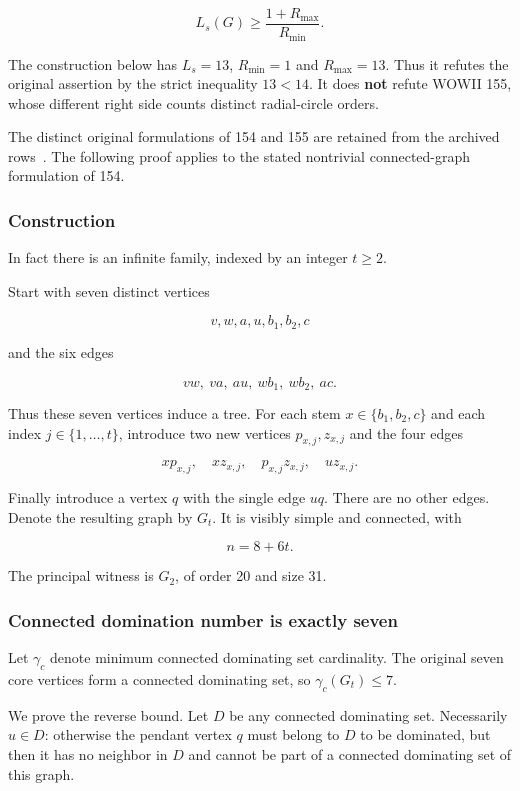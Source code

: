 \documentclass[11pt,a4paper]{article}
\theoremstyle{definition}\newtheorem{definition}[theorem]{Definition}
\theoremstyle{remark}\newtheorem{remark}[theorem]{Remark}
\begin{document}
\[L_s(G)\geq\frac{1+R_{\max}}{R_{\min}}.\]

The construction below has \(L_s=13\), \(R_{\min}=1\) and
\(R_{\max}=13\). Thus it refutes the original assertion by the strict
inequality \(13<14\). It does \textbf{not} refute WOWII 155, whose
different right side counts distinct radial-circle orders.

The distinct original formulations of 154 and 155 are retained from the
archived rows~\cite{src:catalogue}. The following proof applies to the stated
nontrivial connected-graph formulation of 154.

\subsubsection{Construction}\label{late:154:construction}

In fact there is an infinite family, indexed by an integer \(t\geq2\).

Start with seven distinct vertices

\[v,w,a,u,b_1,b_2,c\]

and the six edges

\[vw,\ va,\ au,\ wb_1,\ wb_2,\ ac.\]

Thus these seven vertices induce a tree. For each stem
\(x\in\{b_1,b_2,c\}\) and each index \(j\in\{1,\ldots,t\}\), introduce
two new vertices \(p_{x,j},z_{x,j}\) and the four edges

\[xp_{x,j},\quad xz_{x,j},\quad p_{x,j}z_{x,j},\quad uz_{x,j}.\]

Finally introduce a vertex \(q\) with the single edge \(uq\). There are
no other edges. Denote the resulting graph by \(G_t\). It is visibly
simple and connected, with

\[n=8+6t.\]

The principal witness is \(G_2\), of order 20 and size 31.

\subsubsection{Connected domination number is exactly
seven}\label{late:154:connected-domination-number-is-exactly-seven}

Let \(\gamma_c\) denote minimum connected dominating set cardinality.
The original seven core vertices form a connected dominating set, so
\(\gamma_c(G_t)\leq7\).

We prove the reverse bound. Let \(D\) be any connected dominating set.
Necessarily \(u\in D\): otherwise the pendant vertex \(q\) must belong
to \(D\) to be dominated, but then it has no neighbor in \(D\) and
cannot be part of a connected dominating set of this graph.
\end{document}
